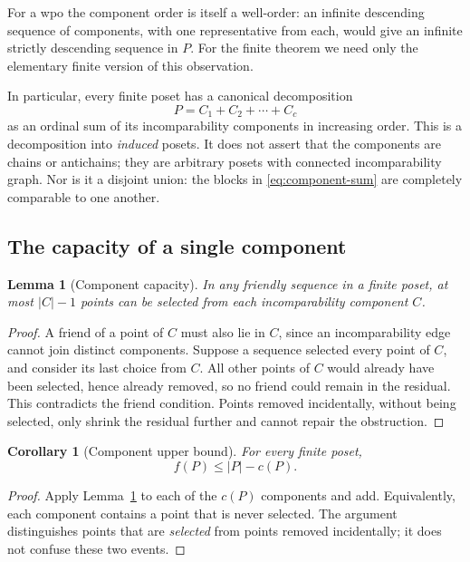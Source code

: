 \documentclass[11pt,letterpaper]{article}
\newtheorem{lemma}[theorem]{Lemma}
\newtheorem{corollary}[theorem]{Corollary}
\theoremstyle{definition}
\theoremstyle{remark}
\begin{document}
For a wpo the component order is itself a well-order: an infinite
descending sequence of components, with one representative from each,
would give an infinite strictly descending sequence in $P$. For the finite
theorem we need only the elementary finite version of this observation.

In particular, every finite poset has a canonical decomposition
\begin{equation}\label{eq:component-sum}
 P=C_1+C_2+\cdots+C_c
\end{equation}
as an ordinal sum of its incomparability components in increasing order.
This is a decomposition into \emph{induced} posets. It does not assert that
the components are chains or antichains; they are arbitrary posets with
connected incomparability graph. Nor is it a disjoint union: the blocks in
\eqref{eq:component-sum} are completely comparable to one another.

\subsection{The capacity of a single component}

\begin{lemma}[Component capacity]\label{lem:capacity}
In any friendly sequence in a finite poset, at most $|C|-1$ points can be
selected from each incomparability component $C$.
\end{lemma}
\begin{proof}
A friend of a point of $C$ must also lie in $C$, since an incomparability
edge cannot join distinct components. Suppose a sequence selected every point
of $C$, and consider its last choice from $C$. All other points of $C$ would
already have been selected, hence already removed, so no friend could remain
in the residual. This contradicts the friend condition. Points removed
incidentally, without being selected, only shrink the residual further and
cannot repair the obstruction.
\end{proof}

\begin{corollary}[Component upper bound]\label{cor:upper}
For every finite poset,
\[
 f(P)\le|P|-c(P).
\]
\end{corollary}
\begin{proof}
Apply Lemma~\ref{lem:capacity} to each of the $c(P)$ components and add.
Equivalently, each component contains a point that is never selected.
The argument distinguishes points that are \emph{selected} from points
removed incidentally; it does not confuse these two events.
\end{proof}
\end{document}
